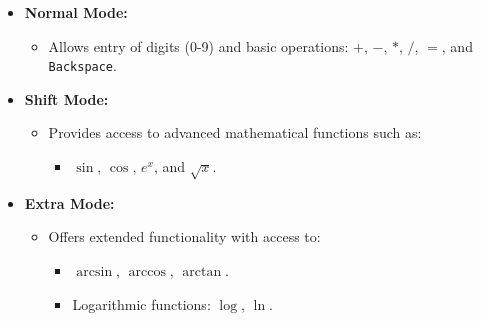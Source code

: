\begin{itemize}
    \item \textbf{Normal Mode:}  
    \begin{itemize}
        \item Allows entry of digits (0-9) and basic operations: \(+\), \(-\), \(*\), \(/\), \(=\), and \texttt{Backspace}.  
    \end{itemize}

    \item \textbf{Shift Mode:}  
    \begin{itemize}
        \item Provides access to advanced mathematical functions such as:  
        \begin{itemize}
            \item \(\sin\), \(\cos\), \(e^x\), and \(\sqrt{x}\).  
        \end{itemize}
    \end{itemize}

    \item \textbf{Extra Mode:}  
    \begin{itemize}
        \item Offers extended functionality with access to:  
        \begin{itemize}
            \item \(\arcsin\), \(\arccos\), \(\arctan\).  
            \item Logarithmic functions: \(\log\), \(\ln\).   
        \end{itemize}
    \end{itemize}
\end{itemize}
